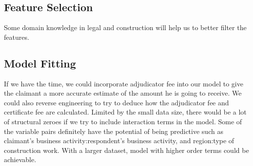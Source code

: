 \documentclass[12pt, b4paper]{article}
\begin{document}
  \subsection{Feature Selection}
  Some domain knowledge in legal and construction will help us to better filter the features.
  \subsection{Model Fitting}
  If we have the time, we could incorporate adjudicator fee into our model to give the claimant a more accurate estimate of the amount he is going to receive.  
  We could also reverse engineering to try to deduce how the adjudicator fee and certificate fee are calculated.
  Limited by the small data size, there would be a lot of structural zeroes if we try to include interaction terms in the model. Some of the variable pairs definitely have the potential of being predictive such as claimant's business activity:respondent's business activity, and region:type of construction work. With a larger dataset, model with higher order terms could be achievable.


\end{document}
